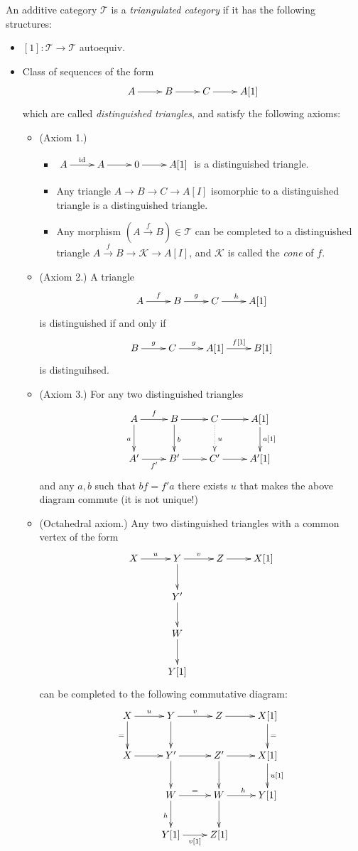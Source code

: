 \begin{definition}
\label{definition-triangulated-category}
An additive category $\mathcal{T}$ is a {\it
triangulated category} if it has the
following structures:
\begin{itemize}
\item $[1]:\mathcal{T} \to \mathcal{T}$
autoequiv.
\item Class of sequences of the form
$$
\xymatrix{
A\ar[r]&B\ar[r]&C\ar[r]&A[1]
}
$$
which are called {\it distinguished
triangles}, and satisfy the following axioms:
\begin{itemize}
\item (Axiom 1.)
\begin{itemize}
\item $\xymatrix{
A\ar[r]^{\text{id}}&A \ar[r]& 0\ar[r]&A[1] }$
is a distinguished triangle.
\item Any triangle $A \to B \to C \to A[I]$
isomorphic to a distinguished
triangle is a distinguished triangle.
\item Any morphism $(A \xrightarrow{f}B)\in
\mathcal{T}$ can be completed to a
distinguished triangle $A\xrightarrow{f}B \to
\mathcal{K} \to A[I]$, and $\mathcal{K}$ is
called the {\it cone} of $f$.
\end{itemize}
\item (Axiom 2.) A triangle
$$
\xymatrix{
A\ar[r]^f &  B \ar[r]^g &  C\ar[r]^h & A[1]
}
$$
is distinguished if and only if
$$
\xymatrix{
B\ar[r]^g &  C \ar[r]^g &  A[1]\ar[r]^{f[1]}
& B[1]
}
$$
is distinguihsed.

\item (Axiom 3.) For any two distinguished
triangles
$$
\xymatrix{
A\ar[r]^f\ar[d]_a &  B \ar[r]\ar[d]^b &  C
\ar@{.>}[d]^{u}\ar[r]&
A[1]\ar[d]^{a[1]}\\
A'\ar[r]_{f'}& B'\ar[r]& C'\ar[r]&A'[1]
}
$$
and any $a,b$ such that $bf=f'a$ there exists
$u$ that makes the above diagram commute (it
is not unique!)

\item (Octahedral axiom.) Any two
distinguished triangles with a common vertex
of the form
$$
\xymatrix{
X\ar[r]^u& Y\ar[r]^v\ar[d]& Z\ar[r]&X[1]\\
& Y'\ar[d]\\
& W\ar[d]\\
& Y[1]
}
$$
can be completed to the following commutative
diagram:
$$
\xymatrix{
X\ar[d]_{=}\ar[r]^u& Y\ar[r]^v\ar[d]&
Z\ar[r]&  X[1]\ar[d]^=\\
X\ar[r]&  Y'\ar[d]\ar[r]&  Z'\ar[d]\ar[r]&
X[1]\ar[d]^{u[1]}\\
& W\ar[r]^=\ar[d]_h & W\ar[r]^h\ar[d]&
Y[1]\\
& Y[1]\ar[r]_{v[1]}&Z[1]
}
$$
\end{itemize}
\end{itemize}
\end{definition}

